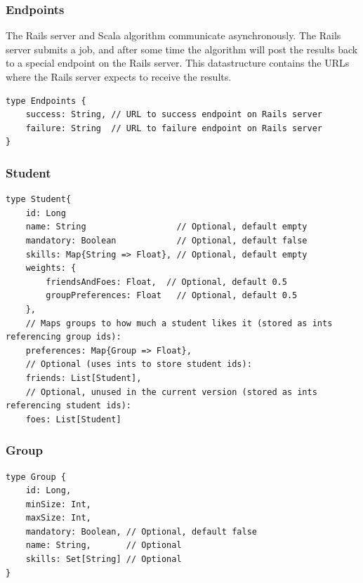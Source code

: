 \subsubsection{Endpoints}
The Rails server and Scala algorithm communicate asynchronously. The Rails server submits a job, and after some time the algorithm will post the results back to a special endpoint on the Rails server. This datastructure contains the URLs where the Rails server expects to receive the results.
\begin{verbatim}
type Endpoints {
	success: String, // URL to success endpoint on Rails server
	failure: String  // URL to failure endpoint on Rails server
}
\end{verbatim}

\subsubsection{Student}
\begin{verbatim}
type Student{
	id: Long
	name: String                  // Optional, default empty
	mandatory: Boolean            // Optional, default false
	skills: Map{String => Float}, // Optional, default empty
	weights: {
		friendsAndFoes: Float,	// Optional, default 0.5
        groupPreferences: Float   // Optional, default 0.5
	},
	// Maps groups to how much a student likes it (stored as ints referencing group ids):
	preferences: Map{Group => Float},
	// Optional (uses ints to store student ids):
	friends: List[Student], 
	// Optional, unused in the current version (stored as ints referencing student ids):
	foes: List[Student] 
\end{verbatim}

\subsubsection{Group}
\begin{verbatim}
type Group {
    id: Long,
    minSize: Int,
    maxSize: Int,
    mandatory: Boolean, // Optional, default false
    name: String,       // Optional
    skills: Set[String] // Optional
}
\end{verbatim}

